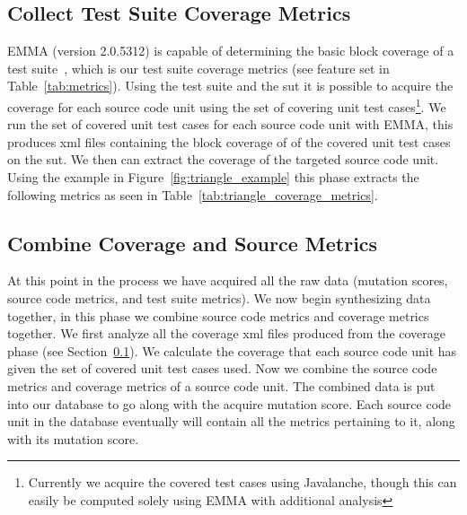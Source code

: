 \subsection{Collect Test Suite Coverage Metrics}
\label{subsec:approach_collect_coverage_metrics}
EMMA (version 2.0.5312) is capable of determining the basic block coverage of a test suite~\cite{EMMA}, which is our test suite coverage metrics (see feature set  in Table~\ref{tab:metrics}). Using the test suite and the \gls{sut} it is possible to acquire the coverage for each source code unit using the set of covering unit test cases\footnote{Currently we acquire the covered test cases using Javalanche, though this can easily be computed solely using EMMA with additional analysis}. We run the set of covered unit test cases for each source code unit with EMMA, this produces \gls{xml} files containing the block coverage of of the covered unit test cases on the \gls{sut}. We then can extract the coverage of the targeted source code unit. Using the example in Figure~\ref{fig:triangle_example} this phase extracts the following metrics as seen in Table~\ref{tab:triangle_coverage_metrics}.


\subsection{Combine Coverage and Source Metrics}
\label{subsec:approach_combine_metrics}
At this point in the process we have acquired all the raw data (mutation scores, source code metrics, and test suite metrics). We now begin synthesizing data together, in this phase we combine source code metrics and coverage metrics together. We first analyze all the coverage \gls{xml} files produced from the coverage phase (see Section~\ref{subsec:approach_collect_coverage_metrics}). We calculate the coverage that each source code unit has given the set of covered unit test cases used. Now we combine the source code metrics and coverage metrics of a source code unit. The combined data is put into our database to go along with the acquire mutation score. Each source code unit in the database eventually will contain all the metrics pertaining to it, along with its mutation score.

